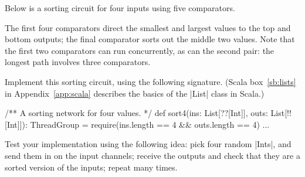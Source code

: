 \begin{question}
Below is a sorting circuit for four inputs using five comparators.
%
\begin{center}
\end{center}
%
The first four comparators direct the smallest and largest values to the top
and bottom outputs; the final comparator sorts out the middle two values.
Note that the first two comparators can run concurrently, as can the second
pair: the longest path involves  three comparators.

\begin{qpart}
\label{Q:sort4}
Implement this sorting circuit, using the following
signature.
(Scala box~\ref{sb:lists} in
Appendix~\ref{app:scala} describes the basics of the |List| class in Scala.)
%  
\begin{scala}
  /** A sorting network for four values. */
  def sort4(ins: List[??[Int]], outs: List[!![Int]]): ThreadGroup = {
    require(ins.length == 4 && outs.length == 4)
    ...
  }
\end{scala}
%
Test your implementation using the following idea: pick four random |Ints|,
and send them in on the input channels; receive the outputs and check that
they are a sorted version of the inputs; repeat many times.
\end{qpart}



\end{question}
